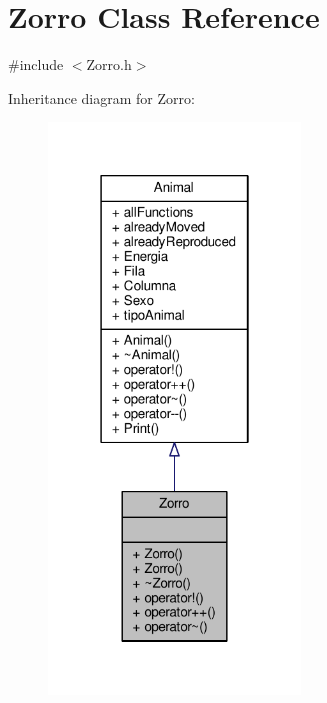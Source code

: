 \hypertarget{classZorro}{}\section{Zorro Class Reference}
\label{classZorro}


{\ttfamily \#include $<$Zorro.\+h$>$}



Inheritance diagram for Zorro\+:\nopagebreak
\begin{figure}[H]
\begin{center}
\leavevmode
\includegraphics[width=190pt]{classZorro__inherit__graph}
\end{center}
\end{figure}


